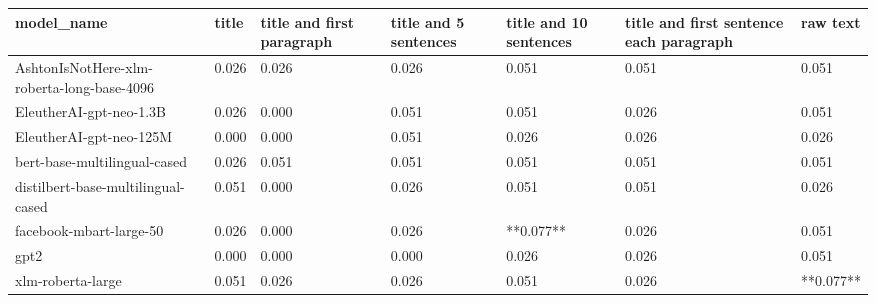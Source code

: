 \begin{tabular}{lllllll}
\toprule
                                model\_name & title & title and first paragraph & title and 5 sentences & title and 10 sentences & title and first sentence each paragraph &  raw text \\
\midrule
AshtonIsNotHere-xlm-roberta-long-base-4096 & 0.026 &                     0.026 &                 0.026 &                  0.051 &                                   0.051 &     0.051 \\
                   EleutherAI-gpt-neo-1.3B & 0.026 &                     0.000 &                 0.051 &                  0.051 &                                   0.026 &     0.051 \\
                   EleutherAI-gpt-neo-125M & 0.000 &                     0.000 &                 0.051 &                  0.026 &                                   0.026 &     0.026 \\
              bert-base-multilingual-cased & 0.026 &                     0.051 &                 0.051 &                  0.051 &                                   0.051 &     0.051 \\
        distilbert-base-multilingual-cased & 0.051 &                     0.000 &                 0.026 &                  0.051 &                                   0.051 &     0.026 \\
                   facebook-mbart-large-50 & 0.026 &                     0.000 &                 0.026 &              **0.077** &                                   0.026 &     0.051 \\
                                      gpt2 & 0.000 &                     0.000 &                 0.000 &                  0.026 &                                   0.026 &     0.051 \\
                         xlm-roberta-large & 0.051 &                     0.026 &                 0.026 &                  0.051 &                                   0.026 & **0.077** \\
\bottomrule
\end{tabular}
